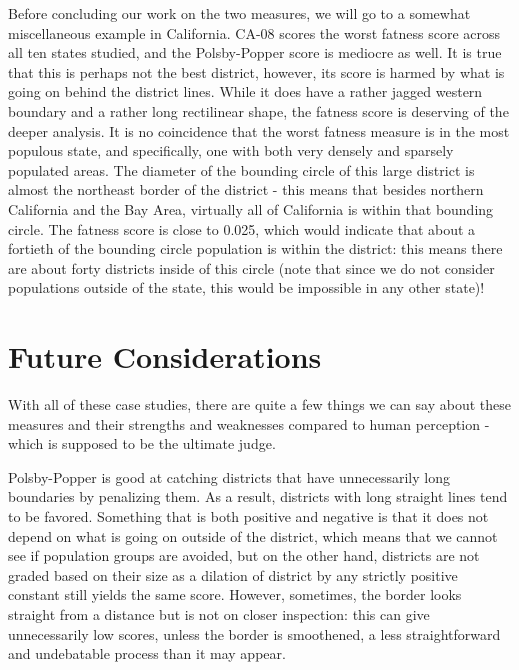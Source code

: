 \documentclass[letterpaper]{article}
\begin{document}
Before concluding our work on the two measures, we will go to a somewhat miscellaneous example in California. CA-08 scores the worst fatness score across all ten states studied, and the Polsby-Popper score is mediocre as well. It is true that this is perhaps not the best district, however, its score is harmed by what is going on behind the district lines. While it does have a rather jagged western boundary and a rather long rectilinear shape, the fatness score is deserving of the deeper analysis. It is no coincidence that the worst fatness measure is in the most populous state, and specifically, one with both very densely and sparsely populated areas. The diameter of the bounding circle of this large district is almost the northeast border of the district - this means that besides northern California and the Bay Area, virtually all of California is within that bounding circle. The fatness score is close to 0.025, which would indicate that about a fortieth of the bounding circle population is within the district: this means there are about forty districts inside of this circle (note that since we do not consider populations outside of the state, this would be impossible in any other state)! 


\section{Future Considerations}
With all of these case studies, there are quite a few things we can say about these measures and their strengths and weaknesses compared to human perception - which is supposed to be the ultimate judge.

Polsby-Popper is good at catching districts that have unnecessarily long boundaries by penalizing them. As a result, districts with long straight lines tend to be favored. Something that is both positive and negative is that it does not depend on what is going on outside of the district, which means that we cannot see if population groups are avoided, but on the other hand, districts are not graded based on their size as a dilation of district by any strictly positive constant still yields the same score. However, sometimes, the border looks straight from a distance but is not on closer inspection: this can give unnecessarily low scores, unless the border is smoothened, a less straightforward and undebatable process than it may appear.
\end{document}
